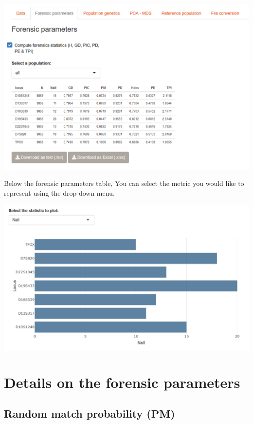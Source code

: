 \documentclass[
]{book}
\begin{document}
\includegraphics[width=1\linewidth]{img/capture_forensics_parameters_1}

Below the forensic parameters table, You can select the metric you would like
to represent using the drop-down menu.

\includegraphics[width=1\linewidth]{img/capture_forensics_parameters_2}

\hypertarget{details-on-the-forensic-parameters}{%
\section{Details on the forensic parameters}\label{details-on-the-forensic-parameters}}

\hypertarget{random-match-probability-pm}{%
\subsection{Random match probability (PM)}\label{random-match-probability-pm}}
\end{document}
